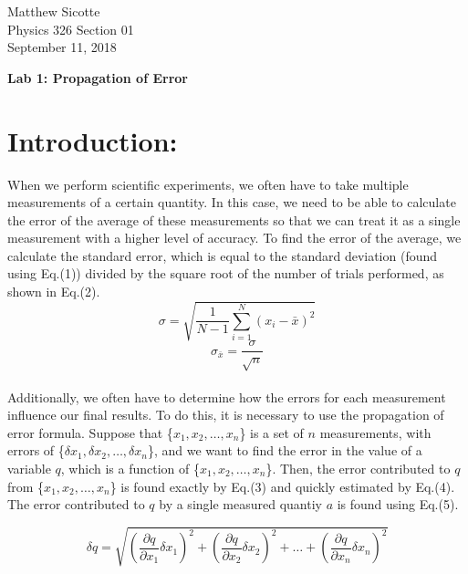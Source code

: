 \documentclass[leqno]{article}
\begin{document}
\begin{flushright}
Matthew Sicotte\\
Physics 326 Section 01\\
September 11, 2018
\end{flushright}
\begin{center}
	{\large \bf Lab 1: Propagation of Error}
\end{center}
\section*{Introduction:}
When we perform scientific experiments, we often have to take multiple measurements of a certain quantity.  In this case, we need to be able to calculate the error of the average of these measurements so that we can treat it as a single measurement with a higher level of accuracy.  To find the error of the average, we calculate the standard error, which is equal to the standard deviation (found using Eq.(1)) divided by the square root of the number of trials performed, as shown in Eq.(2).  
\begin{equation}
	\sigma=\sqrt{\frac{1}{N-1}\sum_{i=1}^{N} (x_i-\bar{x})^2}
\end{equation}
\begin{equation}
	\sigma_{\bar{x}}=\frac{\sigma}{\sqrt{n}}
\end{equation}\\

Additionally, we often have to determine how the errors for each measurement influence our final results.  To do this, it is necessary to use the propagation of error formula.  Suppose that \{$x_1, x_2, \ldots, x_n$\} is a set of $n$ measurements, with errors of \{$\delta x_1, \delta x_2, \ldots, \delta x_n$\}, and we want to find the error in the value of a variable $q$, which is a function of \{$x_1, x_2, \ldots, x_n$\}.  Then, the error contributed to $q$ from \{$x_1, x_2, \ldots, x_n$\} is found exactly by Eq.(3) and quickly estimated by Eq.(4).  The error contributed to $q$ by a single measured quantiy $a$ is found using Eq.(5). 


\begin{equation}
	\delta q=\sqrt{(\frac{\partial q}{\partial x_1}\delta x_1)^2+(\frac{\partial q}{\partial x_2}\delta x_2)^2+\ldots+(\frac{\partial q}{\partial x_n}\delta x_n)^2}
\end{equation}
\end{document}
